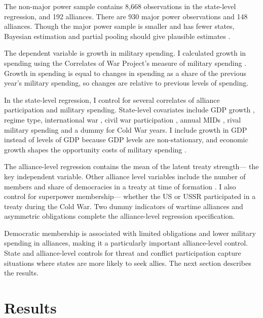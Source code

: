 \documentclass[12pt]{article}
\begin{document}
The non-major power sample contains 8,668 observations in the state-level regression, and 192 alliances. 
There are 930 major power observations and 148 alliances. 
Though the major power sample is smaller and has fewer states, Bayesian estimation and partial pooling should give plausible estimates \citep{Stegmueller2013}. 

The dependent variable is growth in military spending.
I calculated growth in spending using the Correlates of War Project's measure of military spending \citep{SingerCINC1988}. 
Growth in spending is equal to changes in spending as a share of the previous year's military spending, so changes are relative to previous levels of spending. 


In the state-level regression, I control for several correlates of alliance participation and military spending. 
State-level covariates include GDP growth \citep{Boltetal2018}, regime type, international war \citep{Reiteretal2016}, civil war participation \citep{SarkeesWayman2010}, annual MIDs \citep{Gibleretal2016}, rival military spending \citep{ThompsonDreyer2012} and a dummy for Cold War years.
I include growth in GDP instead of levels of GDP because GDP levels are non-stationary, and economic growth shapes the opportunity costs of military spending \citep{Kimball2010, Zielinskietal2017}.


The alliance-level regression contains the mean of the latent treaty strength--- the key independent variable. 
Other alliance level variables include the number of members and share of democracies in a treaty at time of formation \citep{Chibaetal2015}.
I also control for superpower membership--- whether the US or USSR participated in a treaty during the Cold War. 
Two dummy indicators of wartime alliances and asymmetric obligations \citep{Leedsetal2002} complete the alliance-level regression specification. 


Democratic membership is associated with limited obligations \citep{Chibaetal2015} and lower military spending \citep{DigiuseppePoast2016} in alliances, making it a particularly important alliance-level control.  
State and alliance-level controls for threat and conflict participation capture situations where states are more likely to seek allies. 
The next section describes the results.
 

\section{Results}
\end{document}
